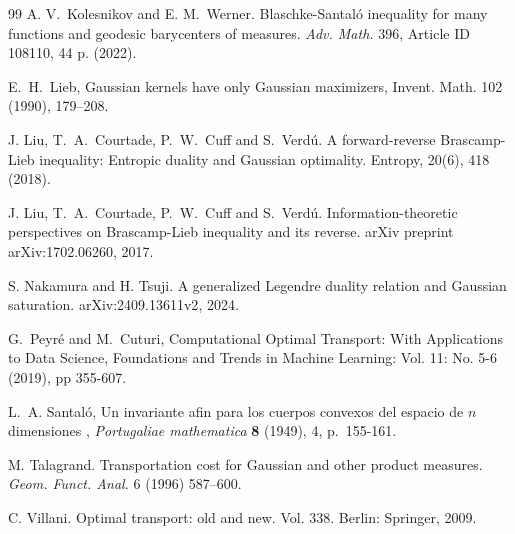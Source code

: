 \documentclass[10pt]{article}
\begin{document}
{\begin{thebibliography}{99}
 A. V.~Kolesnikov and E. M.~Werner. 
Blaschke-Santaló inequality for many functions and geodesic barycenters of measures. 
\textit{Adv. Math.} 396, Article ID 108110, 44 p. (2022). 

  E.~H.~Lieb, Gaussian kernels have only Gaussian maximizers, Invent. Math. 102 (1990), 179–208.

  J. Liu, T.~A.~Courtade, P.~W.~Cuff and S.~Verd\'u. A forward-reverse Brascamp-Lieb inequality: Entropic duality and Gaussian optimality. Entropy, 20(6), 418 (2018).
 
  J. Liu, T.~A.~Courtade, P.~W.~Cuff and S.~Verd\'u.  Information-theoretic perspectives on Brascamp-Lieb inequality and its reverse. arXiv preprint arXiv:1702.06260, 2017.
 
 S. Nakamura and H. Tsuji. A generalized Legendre duality relation and Gaussian saturation. {arXiv:2409.13611v2}, 2024. 

G.~Peyr\'e and M.~Cuturi, Computational Optimal Transport: With Applications to Data Science, Foundations and Trends in Machine Learning: Vol. 11: No. 5-6 (2019), pp 355-607. 

 L.~A. Santal\'o,  Un invariante afin para los cuerpos convexos del espacio
  de $n$ dimensiones , \emph{Portugaliae mathematica} \textbf{8} (1949),
   4, p.~155-161.
  
 M. Talagrand. Transportation cost for Gaussian and other product measures. \textit{Geom. Funct. Anal.} 6 (1996) 587--600. 

 C. Villani. Optimal transport: old and new. Vol. 338. Berlin: Springer, 2009. 

\end{thebibliography}
}
\end{document}
